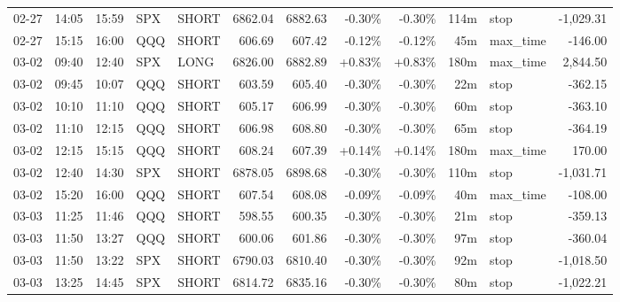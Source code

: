 \documentclass[11pt,a4paper,twoside]{article}
\begin{document}
\begin{center}
\begin{longtable}{>{\color{txtmain}}l l l l l r r r r r >{\color{txtmain}}l r}
02-27 & 14:05 & 15:59 & SPX & SHORT & 6862.04 & 6882.63 & \textcolor{lossred}{-0.30\%} & \textcolor{lossred}{-0.30\%} & 114m & stop & \textcolor{lossred}{-1,029.31} \\
02-27 & 15:15 & 16:00 & QQQ & SHORT & 606.69 & 607.42 & \textcolor{lossred}{-0.12\%} & \textcolor{lossred}{-0.12\%} & 45m & max\_time & \textcolor{lossred}{-146.00} \\
03-02 & 09:40 & 12:40 & SPX & LONG & 6826.00 & 6882.89 & \textcolor{wingreen}{+0.83\%} & \textcolor{wingreen}{+0.83\%} & 180m & max\_time & \textcolor{wingreen}{2,844.50} \\
03-02 & 09:45 & 10:07 & QQQ & SHORT & 603.59 & 605.40 & \textcolor{lossred}{-0.30\%} & \textcolor{lossred}{-0.30\%} & 22m & stop & \textcolor{lossred}{-362.15} \\
03-02 & 10:10 & 11:10 & QQQ & SHORT & 605.17 & 606.99 & \textcolor{lossred}{-0.30\%} & \textcolor{lossred}{-0.30\%} & 60m & stop & \textcolor{lossred}{-363.10} \\
03-02 & 11:10 & 12:15 & QQQ & SHORT & 606.98 & 608.80 & \textcolor{lossred}{-0.30\%} & \textcolor{lossred}{-0.30\%} & 65m & stop & \textcolor{lossred}{-364.19} \\
03-02 & 12:15 & 15:15 & QQQ & SHORT & 608.24 & 607.39 & \textcolor{wingreen}{+0.14\%} & \textcolor{wingreen}{+0.14\%} & 180m & max\_time & \textcolor{wingreen}{170.00} \\
03-02 & 12:40 & 14:30 & SPX & SHORT & 6878.05 & 6898.68 & \textcolor{lossred}{-0.30\%} & \textcolor{lossred}{-0.30\%} & 110m & stop & \textcolor{lossred}{-1,031.71} \\
03-02 & 15:20 & 16:00 & QQQ & SHORT & 607.54 & 608.08 & \textcolor{lossred}{-0.09\%} & \textcolor{lossred}{-0.09\%} & 40m & max\_time & \textcolor{lossred}{-108.00} \\
03-03 & 11:25 & 11:46 & QQQ & SHORT & 598.55 & 600.35 & \textcolor{lossred}{-0.30\%} & \textcolor{lossred}{-0.30\%} & 21m & stop & \textcolor{lossred}{-359.13} \\
03-03 & 11:50 & 13:27 & QQQ & SHORT & 600.06 & 601.86 & \textcolor{lossred}{-0.30\%} & \textcolor{lossred}{-0.30\%} & 97m & stop & \textcolor{lossred}{-360.04} \\
03-03 & 11:50 & 13:22 & SPX & SHORT & 6790.03 & 6810.40 & \textcolor{lossred}{-0.30\%} & \textcolor{lossred}{-0.30\%} & 92m & stop & \textcolor{lossred}{-1,018.50} \\
03-03 & 13:25 & 14:45 & SPX & SHORT & 6814.72 & 6835.16 & \textcolor{lossred}{-0.30\%} & \textcolor{lossred}{-0.30\%} & 80m & stop & \textcolor{lossred}{-1,022.21} \\

\end{longtable}
\end{center}
\end{document}
